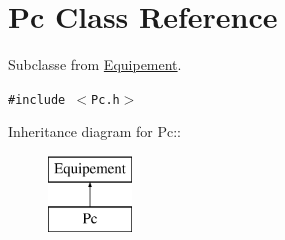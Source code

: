 \hypertarget{class_pc}{
\section{Pc Class Reference}
\label{class_pc}
}
Subclasse from \hyperlink{class_equipement}{Equipement}.  


{\tt \#include $<$Pc.h$>$}

Inheritance diagram for Pc::\begin{figure}[H]
\begin{center}
\leavevmode
\includegraphics[height=2cm]{class_pc}
\end{center}
\end{figure}
